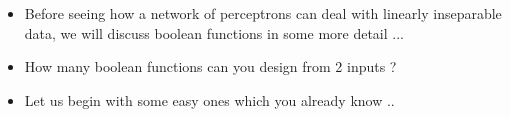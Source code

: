 \documentclass[serif, aspectratio=169]{beamer}
\begin{document}
\begin{frame}
	\begin{itemize}\justifying
		\item<1-> Before seeing how a network of perceptrons can deal with linearly inseparable data, we will discuss boolean functions in some more detail ...
	\end{itemize}
\end{frame}


\begin{frame}
	\begin{itemize}\justifying
		\item How many boolean functions can you design from 2 inputs ?
		\item<2-> Let us begin with some easy ones which you already know ..
\end{itemize}
\end{frame}
\end{document}

